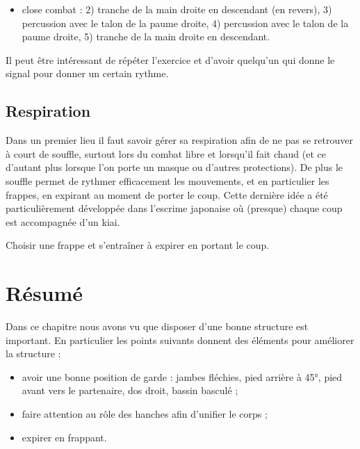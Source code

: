 \begin{exercice}
\begin{itemize}
	\item close combat : 2) tranche de la main droite en descendant (en revers), 3) percussion avec le talon de la paume droite, 4) percussion avec le talon de la paume droite, 5) tranche de la main droite en descendant.
	
	
\end{itemize}

Il peut être intéressant de répéter l'exercice et d'avoir quelqu'un qui donne le signal pour donner un certain rythme.

\end{exercice}



\subsection{Respiration}


Dans un premier lieu il faut savoir gérer sa respiration afin de ne pas se retrouver à court de souffle, surtout lors du combat libre et lorsqu'il fait chaud (et ce d'autant plus lorsque l'on porte un masque ou d'autres protections).
De plus le souffle permet de rythmer efficacement les mouvements, et en particulier les frappes, en expirant au moment de porter le coup.
Cette dernière idée a été particulièrement développée dans l'escrime japonaise où (presque) chaque coup est accompagnée d'un kiai.


\begin{exercice}

Choisir une frappe et s'entraîner à expirer en portant le coup.

\end{exercice}


\section{Résumé}


Dans ce chapitre nous avons vu que disposer d'une bonne structure est important.
En particulier les points suivants donnent des éléments pour améliorer la structure :
\begin{itemize}
	\item avoir une bonne position de garde : jambes fléchies, pied arrière à 45°, pied avant vers le partenaire, dos droit, bassin basculé ;
	\item faire attention au rôle des hanches afin d'unifier le corps ;
	\item expirer en frappant.
\end{itemize}



